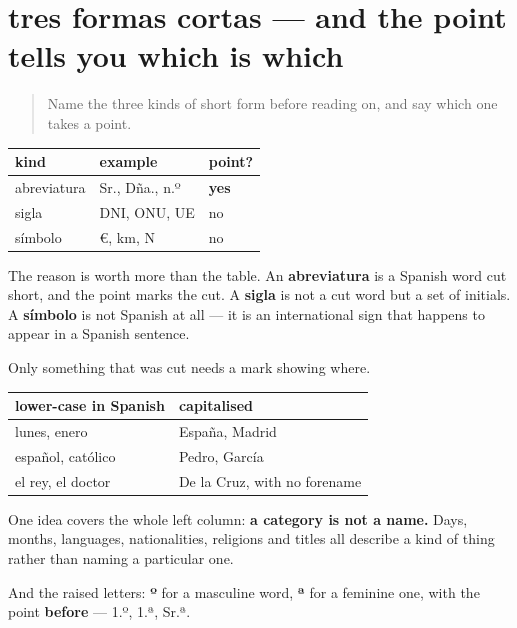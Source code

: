 \section[tres formas cortas]{tres formas cortas — and the point tells you which is which}

\label{lesson:ES-C426-repaso-cortas}



\begin{quote}
Name the three kinds of short form before reading on, and say which one takes a point.
\end{quote}

\begin{grammarlens}[title={Grammar Lens: one test separates all three}]
\noindent
\begin{tabularx}{\linewidth}{@{}>{\raggedright\arraybackslash}X>{\raggedright\arraybackslash}X>{\raggedright\arraybackslash}X@{}}
\toprule
\textbf{kind} & \textbf{example} & \textbf{point?} \\
\midrule
abreviatura & Sr., Dña., n.º & \textbf{yes} \\
sigla & DNI, ONU, UE & no \\
símbolo & €, km, N & no \\
\bottomrule
\end{tabularx}

The reason is worth more than the table. An \textbf{abreviatura} is a Spanish word cut short, and the point marks the cut. A \textbf{sigla} is not a cut word but a set of initials. A \textbf{símbolo} is not Spanish at all — it is an international sign that happens to appear in a Spanish sentence.

Only something that was cut needs a mark showing where.
\end{grammarlens}

\begin{grammarlens}[title={Grammar Lens: the capitals, gathered}]
\noindent
\begin{tabularx}{\linewidth}{@{}>{\raggedright\arraybackslash}X>{\raggedright\arraybackslash}X@{}}
\toprule
\textbf{lower-case in Spanish} & \textbf{capitalised} \\
\midrule
lunes, enero & España, Madrid \\
español, católico & Pedro, García \\
el rey, el doctor & De la Cruz, with no forename \\
\bottomrule
\end{tabularx}

One idea covers the whole left column: \textbf{a category is not a name.} Days, months, languages, nationalities, religions and titles all describe a kind of thing rather than naming a particular one.

And the raised letters: \textbf{º} for a masculine word, \textbf{ª} for a feminine one, with the point \textbf{before} — 1.º, 1.ª, Sr.ª.
\end{grammarlens}


